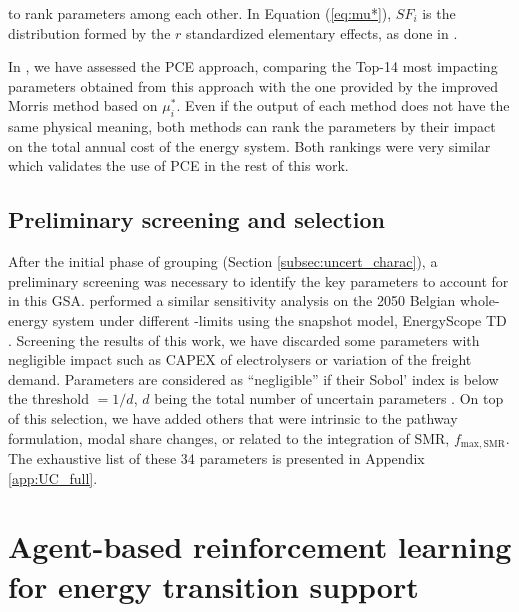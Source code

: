 to rank parameters among each other. In Equation (\ref{eq:mu*}), $SF_{i}$ is the distribution formed by the $r$ standardized elementary effects, as done in \citet{Moret2017PhDThesis}.

In \cite{limpens2020impact}, we have assessed the \gls{PCE} approach, comparing the Top-14 most impacting parameters obtained from this approach with the one provided by the improved Morris method based on $\mu^*_{i}$. Even if the output of each method does not have the same physical meaning, both methods can rank the parameters by their impact on the total annual  cost  of  the  energy  system. Both rankings were very similar which validates the use of \gls{PCE} in the rest of this work.


\subsection{Preliminary screening and selection}
\label{subsec:screening}

After the initial phase of grouping (Section \ref{subsec:uncert_charac}), a preliminary screening was necessary to identify the key parameters to account for in this \gls{GSA}. \citet{rixhon2021role} performed a similar sensitivity analysis on the 2050 Belgian whole-energy system under different -limits using the snapshot model, EnergyScope TD \cite{limpens2019energyscope}. Screening the results of this work, we have discarded some parameters with negligible impact such as CAPEX of electrolysers or variation of the freight demand. Parameters are considered as ``negligible'' if their Sobol' index is below the threshold $=1/d$, $d$ being the total number of uncertain parameters \cite{Turati2017}. On top of this selection, we have added others that were intrinsic to the pathway formulation, \eg modal share changes, or related to the integration of \gls{SMR}, $f_{\mathrm{max,SMR}}$. The exhaustive list of these 34 parameters is presented in Appendix \ref{app:UC_full}.


\section{Agent-based reinforcement learning for energy transition support}
\label{sec:meth:RL}



